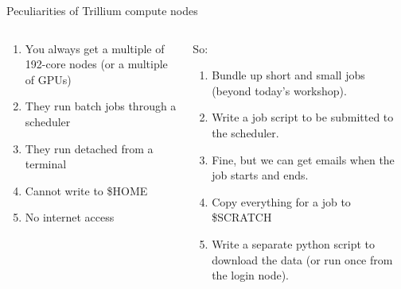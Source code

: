 \documentclass[
  10pt,
  ignorenonframetext,
  aspectratio=169,handout]{beamer}
\begin{document}
\begin{frame}{Peculiarities of Trillium compute nodes}
\label{peculiarities-of-trillium-compute-nodes}
\begin{columns}[T]
\begin{column}{0.31\linewidth}\setlength{\parskip}{0.5\baselineskip}
\vspace{\baselineskip}

\begin{enumerate}
\item
  You always get a multiple of 192-core nodes (or a multiple of GPUs)

  \pause
\item
  They run batch jobs through a scheduler

  \pause
\item
  They run detached from a terminal

  \pause
\item
  Cannot write to \$HOME

  \pause
\item
  No internet access

  \pause
\end{enumerate}
\end{column}

\begin{column}{0.62\linewidth}\setlength{\parskip}{0.5\baselineskip}
So:

\begin{enumerate}
\item
  Bundle up short and small jobs (beyond today's workshop).\\
  \vspace{\baselineskip} \vspace{\baselineskip}

  \pause
\item
  Write a job script to be submitted to the scheduler. \vspace{\baselineskip}

  \pause
\item
  Fine, but we can get emails when the job starts and ends. \vspace{\baselineskip}

  \pause
\item
  Copy everything for a job to \$SCRATCH

  \pause
\item
  Write a separate python script to download the data (or run once from the login node).
\end{enumerate}
\end{column}
\end{columns}
\end{frame}
\end{document}
